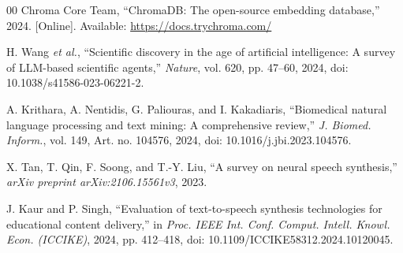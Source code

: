 \documentclass[conference]{IEEEtran}
\begin{document}
\begin{thebibliography}{00}
 Chroma Core Team, ``ChromaDB: The open-source embedding database,'' 2024. [Online]. Available: \url{https://docs.trychroma.com/}

 H. Wang \textit{et al.}, ``Scientific discovery in the age of artificial intelligence: A survey of LLM-based scientific agents,'' \textit{Nature}, vol. 620, pp. 47--60, 2024, doi: 10.1038/s41586-023-06221-2.

 A. Krithara, A. Nentidis, G. Paliouras, and I. Kakadiaris, ``Biomedical natural language processing and text mining: A comprehensive review,'' \textit{J. Biomed. Inform.}, vol. 149, Art. no. 104576, 2024, doi: 10.1016/j.jbi.2023.104576.

 X. Tan, T. Qin, F. Soong, and T.-Y. Liu, ``A survey on neural speech synthesis,'' \textit{arXiv preprint arXiv:2106.15561v3}, 2023.

 J. Kaur and P. Singh, ``Evaluation of text-to-speech synthesis technologies for educational content delivery,'' in \textit{Proc. IEEE Int. Conf. Comput. Intell. Knowl. Econ. (ICCIKE)}, 2024, pp. 412--418, doi: 10.1109/ICCIKE58312.2024.10120045.
\end{thebibliography}
\end{document}
